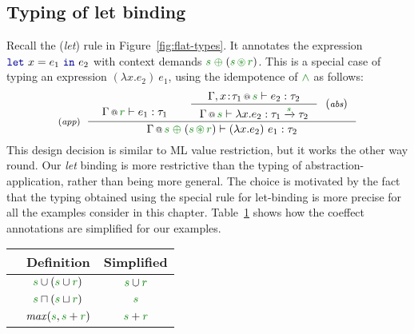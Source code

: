 
\subsection{Typing of let binding}
\label{sec:flat-exts-let}

Recall the (\emph{let}) rule in Figure~\ref{fig:flat-types}. It annotates the expression
$\kvd{let}~x=e_1~\kvd{in}~e_2$ with context demands $\cclrd{s}\;\cpar\;(\cclrd{s}\,\cseq\,\cclrd{r})$.
This is a special case of typing an expression $(\lambda x.e_2)~e_1$, using the idempotence
of $\czip$ as follows:
%
\begin{equation*}
\tyrule{app}
  {\begin{array}{l}
   \vspace{-1.5em}
   \coctx{\Gamma}{\cclrd{r}} \vdash e_1 : \tau_1
   \end{array} &
   \tyruler{abs}
       { \coctx{\Gamma, x\!:\!\tau_1}{\cclrd{s}} \vdash e_2 : \tau_2 }
       { \coctx{\Gamma}{\cclrd{s}} \vdash \lambda x.e_2 : \tau_1 \xrightarrow{\cclrd{s}} \tau_2 } }
  { \coctx{\Gamma}{\cclrd{s}\;\cpar\;(\cclrd{s}\,\cseq\,\cclrd{r})} \vdash (\lambda x.e_2)~e_1 : \tau_2 }
\end{equation*}
%
This design decision is similar to ML value restriction, but it works the other way round. Our
\emph{let} binding is more restrictive than the typing of abstraction-application, rather than
being more general. The choice is motivated by the fact that the typing obtained using the special
rule for let-binding is more precise for all the examples consider
in this chapter. Table~\ref{tab:flat-simplelet} shows how the coeffect annotations are simplified
for our examples.

\begin{table}
\begin{center}
\begin{tabular}{ | l | c | c |}
\hline
& \textbf{\footnotesize Definition\hspace{1em}} & \textbf{\footnotesize Simplified\hspace{1em}} \\ \hline
\hspace{-1em}{\footnotesize Implicit parameters} & $\cclrd{s} \cup (\cclrd{s} \cup \cclrd{r})$ & $\cclrd{s} \cup \cclrd{r}$ \\ \hline
\hspace{-1em}{\footnotesize Liveness} & $\cclrd{s} \sqcap (\cclrd{s} \sqcup \cclrd{r})$ & $\cclrd{s}$ \\ \hline
\hspace{-1em}{\footnotesize Dataflow} & $\mathit{max}(\cclrd{s}, \cclrd{s} + \cclrd{r})$ & $\cclrd{s} + \cclrd{r}$ \\ \hline
\end{tabular}
\end{center}

\vspace{-0.5em}
\label{tab:flat-simplelet}
\end{table}

